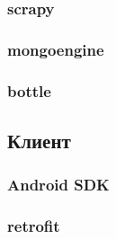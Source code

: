 		
		\subsubsection{scrapy}
		\subsubsection{mongoengine}
		\subsubsection{bottle}
	\subsection{Клиент}
		\subsubsection{Android SDK}
		\subsubsection{retrofit}